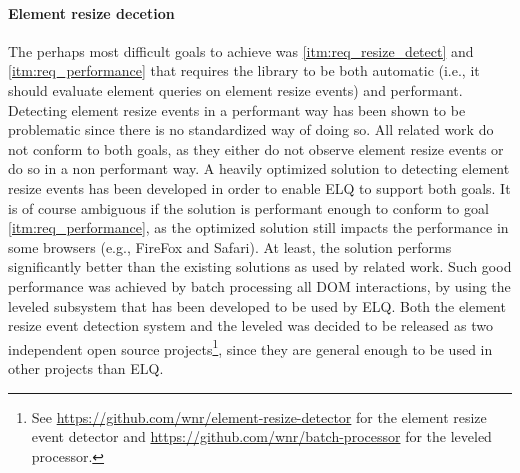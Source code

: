\documentclass[a4paper,11pt]{kth-mag}
\begin{document}
    \paragraph{Element resize decetion}
    The perhaps most difficult goals to achieve was \ref{itm:req_resize_detect} and \ref{itm:req_performance} that requires the library to be both automatic (i.e., it should evaluate element queries on element resize events) and performant.
    Detecting element resize events in a performant way has been shown to be problematic since there is no standardized way of doing so.
    All related work do not conform to both goals, as they either do not observe element resize events or do so in a non performant way.
    A heavily optimized solution to detecting element resize events has been developed in order to enable \gls{ELQ} to support both goals.
    It is of course ambiguous if the solution is performant enough to conform to goal \ref{itm:req_performance}, as the optimized solution still impacts the performance in some \glspl{browser} (e.g., FireFox and Safari).
    At least, the solution performs significantly better than the existing solutions as used by related work.
    Such good performance was achieved by \gls{batch processing} all \gls{DOM} interactions, by using the leveled  subsystem that has been developed to be used by \gls{ELQ}.
    Both the element resize event detection system and the leveled  was decided to be released as two independent open source projects\footnote{See \url{https://github.com/wnr/element-resize-detector} for the element resize event detector and \url{https://github.com/wnr/batch-processor} for the leveled  processor.}, since they are general enough to be used in other projects than \gls{ELQ}.
\end{document}
